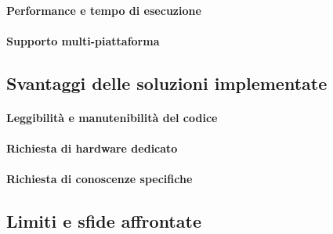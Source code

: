 \lipsum[1]

\paragraph{Performance e tempo di esecuzione}
\label{para:performance}

\lipsum[1]

\paragraph{Supporto multi-piattaforma}
\label{para:supporto}

\lipsum[1]

\subsection{Svantaggi delle soluzioni implementate}
\label{sec:svantaggi}

\lipsum[1]

\paragraph{Leggibilità e manutenibilità del codice}
\label{para:leggibilita}

\lipsum[1]

\paragraph{Richiesta di hardware dedicato}
\label{para:hardware}

\lipsum[1]

\paragraph{Richiesta di conoscenze specifiche}
\label{para:conoscenze}

\lipsum[1]

\subsection{Limiti e sfide affrontate}
\label{subsec:limiti}

\lipsum[1]